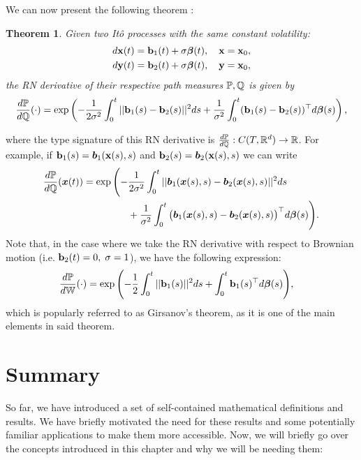 \documentclass[a4paper,12pt,twoside,openright]{report}
\newtheorem{theorem}{Theorem}
\theoremstyle{definition}
\begin{document}
We can now present the following theorem \citep{sarkka2019applied}:
\begin{theorem}\label{thrm:ito_ratio}\citep{sarkka2019applied}
Given two Itô processes with the same constant volatility: 
    \begin{align*}
        d{\mathbf{x}}(t) = {\mathbf{b}}_1(t) + \sigma {\bm{\beta}}(t), \quad {\mathbf{x}} = {\mathbf{x}}_0, \\
        d{\mathbf{y}}(t) = {\mathbf{b}}_2(t) + \sigma{\bm{\beta}}(t), \quad {\mathbf{y}} = {\mathbf{x}}_0,
    \end{align*}
the RN derivative of their respective path measures ${\mathbb{P}},{\mathbb{Q}}$ is given by
\begin{align} \label{eq:girsanov}
    \frac{d{\mathbb{P}}}{d{\mathbb{Q}}}(\cdot) = \exp\left(-\frac{1}{2\sigma^2}\int_0^t ||{\mathbf{b}}_1(s) - {\mathbf{b}}_2(s)||^2 ds + \frac{1}{\sigma^2}\int_0^t ({\mathbf{b}}_1(s) - {\mathbf{b}}_2(s))^{\top}d{\bm{\beta}}(s) \right),
\end{align}
\end{theorem}
where the type signature of this RN derivative is $\frac{d{\mathbb{P}}}{d{\mathbb{Q}}}: C(T, {\mathbb{R}}^d) \rightarrow {\mathbb{R}}$. For example, if  ${\mathbf{b}}_1(s)={\bm{b}}_1({\mathbf{x}}(s), s)$ and ${\mathbf{b}}_2(s)={\bm{b}}_2({\mathbf{x}}(s), s)$ we can write
\begin{align*}
    \frac{d{\mathbb{P}}}{d{\mathbb{Q}}}({\bm{x}}(t)) = \exp\Bigg(-&\frac{1}{2\sigma^2}\int_0^t ||{\bm{b}}_1({\bm{x}}(s), s) - {\bm{b}}_2({\bm{x}}(s), s)||^2 ds \\ 
    &+ \frac{1}{\sigma^2}\int_0^t \big({\bm{b}}_1({\bm{x}}(s), s) - {\bm{b}}_2({\bm{x}}(s), s)\big)^{\top}d{\bm{\beta}}(s) \Bigg).
\end{align*}
Note that, in the case where we take the RN derivative with respect to Brownian motion (i.e. ${\mathbf{b}}_2(t) =0, \; \sigma=1$), we have the following expression:
\begin{align} \label{eq:girsanov_0}
    \frac{d{\mathbb{P}}}{d\mathbb{W}}(\cdot) = \exp\Bigg(-&\frac{1}{2}\int_0^t ||{\mathbf{b}}_1(s) ||^2 ds+ \int_0^t {\mathbf{b}}_1(s)^{\top}d{\bm{\beta}}(s) \Bigg),
\end{align}
which is popularly referred to as Girsanov's theorem, as it is one of the main elements in said theorem.

\section{Summary }

So far, we have introduced a set of self-contained mathematical definitions and results. We have briefly motivated the need for these results and some potentially familiar applications to make them more accessible. Now, we will briefly go over the concepts introduced in this chapter and why we will be needing them:
\end{document}
